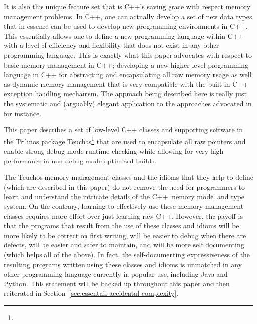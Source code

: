 \documentclass[pdf,ps2pdf,11pt]{SANDreport}
\begin{document}
It is also this unique feature set that is C++'s saving grace with
respect memory management problems.  In C++, one can actually develop
a set of new data types that in essence can be used to develop new
programming environments in C++.  This essentially allows one to
define a new programming language within C++ with a level of
efficiency and flexibility that does not exist in any other
programming language.  This is exactly what this paper advocates with
respect to basic memory management in C++; developing a new
higher-level programming language in C++ for abstracting and
encapsulating all raw memory usage as well as dynamic memory
management that is very compatible with the built-in C++ exception
handling mechanism.  The approach being described here is really just
the systematic and (arguably) elegant application to the approaches
advocated in {}\cite[Section 13.2: Pointers]{CodeComplete2nd04} for
instance.

This paper describes a set of low-level C++ classes and supporting
software in the Trilinos package
Teuchos\footnote{}
that are used to encapsulate all raw pointers and enable strong
debug-mode runtime checking while allowing for very high performance
in non-debug-mode optimized builds.

The Teuchos memory management classes and the idioms that they help to
define (which are described in this paper) do not remove the need for
programmers to learn and understand the intricate details of the C++
memory model and type system.  On the contrary, learning to
effectively use these memory management classes requires more effort
over just learning raw C++.  However, the payoff is that the programs
that result from the use of these classes and idioms will be more
likely to be correct on first writing, will be easier to debug when
there are defects, will be easier and safer to maintain, and will be
more self documenting (which helps all of the above).  In fact, the
self-documenting expressiveness of the resulting programs written
using these classes and idioms is unmatched in any other programming
language currently in popular use, including Java and Python.  This
statement will be backed up throughout this paper and then reiterated
in Section~\ref{sec:essentail-accidental-complexity}.
\end{document}
